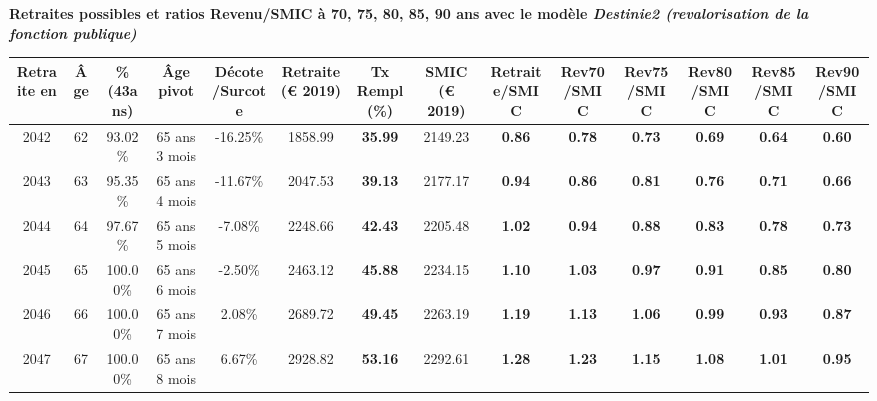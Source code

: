  \vspace{0.1cm} 
{\bf \noindent Retraites possibles et ratios Revenu/SMIC à 70, 75, 80, 85, 90 ans avec le modèle \emph{Destinie2 (revalorisation de la fonction publique)}}  
 
\begin{adjustbox}{max width=\textwidth} 
\begin{tabular}[htb]{|c|c||c|c|c||c|c||c||c|c|c|c|c|c|} 
\hline 
 Retraite en &  Âge &  \%(43ans) &  Âge pivot &  Décote/Surcote &  Retraite (\euro{} 2019) &  Tx Rempl(\%) &  SMIC (\euro{} 2019) &  Retraite/SMIC &  Rev70/SMIC &  Rev75/SMIC &  Rev80/SMIC &  Rev85/SMIC &  Rev90/SMIC \\ 
\hline \hline 
 2042 &  62 &  93.02\% &  65 ans 3 mois &  -16.25\% &  1858.99 &  {\bf 35.99} &  2149.23 &  {\bf {\color{red} 0.86}} &  {\bf {\color{red} 0.78}} &  {\bf {\color{red} 0.73}} &  {\bf {\color{red} 0.69}} &  {\bf {\color{red} 0.64}} &  {\bf {\color{red} 0.60}} \\ 
\hline 
 2043 &  63 &  95.35\% &  65 ans 4 mois &  -11.67\% &  2047.53 &  {\bf 39.13} &  2177.17 &  {\bf {\color{red} 0.94}} &  {\bf {\color{red} 0.86}} &  {\bf {\color{red} 0.81}} &  {\bf {\color{red} 0.76}} &  {\bf {\color{red} 0.71}} &  {\bf {\color{red} 0.66}} \\ 
\hline 
 2044 &  64 &  97.67\% &  65 ans 5 mois &  -7.08\% &  2248.66 &  {\bf 42.43} &  2205.48 &  {\bf 1.02} &  {\bf {\color{red} 0.94}} &  {\bf {\color{red} 0.88}} &  {\bf {\color{red} 0.83}} &  {\bf {\color{red} 0.78}} &  {\bf {\color{red} 0.73}} \\ 
\hline 
 2045 &  65 &  100.00\% &  65 ans 6 mois &  -2.50\% &  2463.12 &  {\bf 45.88} &  2234.15 &  {\bf 1.10} &  {\bf 1.03} &  {\bf {\color{red} 0.97}} &  {\bf {\color{red} 0.91}} &  {\bf {\color{red} 0.85}} &  {\bf {\color{red} 0.80}} \\ 
\hline 
 2046 &  66 &  100.00\% &  65 ans 7 mois &  2.08\% &  2689.72 &  {\bf 49.45} &  2263.19 &  {\bf 1.19} &  {\bf 1.13} &  {\bf 1.06} &  {\bf {\color{red} 0.99}} &  {\bf {\color{red} 0.93}} &  {\bf {\color{red} 0.87}} \\ 
\hline 
 2047 &  67 &  100.00\% &  65 ans 8 mois &  6.67\% &  2928.82 &  {\bf 53.16} &  2292.61 &  {\bf 1.28} &  {\bf 1.23} &  {\bf 1.15} &  {\bf 1.08} &  {\bf 1.01} &  {\bf {\color{red} 0.95}} \\ 
\hline 
\hline 
\end{tabular} 
\end{adjustbox} 
 
 \vspace{0.1cm} 

